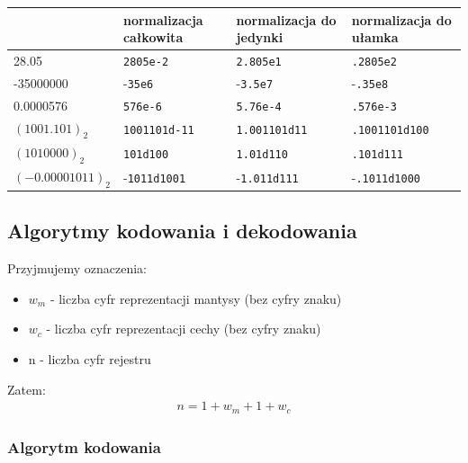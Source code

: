 \documentclass[12pt]{article}
\begin{document}
        \begin{table}
        \centering
        \begin{tabular}{l|l|l|l}
                          & normalizacja
        całkowita & normalizacja
        do jedynki & normalizacja
        do ułamka  \\ 
        \hline
        28.05             & \texttt{2805e-2}                & \texttt{2.805e1}                  & \texttt{.2805e2}                  \\
        -35000000         & -\texttt{35e6}                & -\texttt{3.5e7}                   & -\texttt{.35e8}                   \\
        0.0000576         & \texttt{576e-6}                  & \texttt{5.76e-4}                  & \texttt{.576e-3}                  \\ 
        \hline
        $(1001.101)_2$    & \texttt{1001101d-11}             & \texttt{1.001101d11}              & \texttt{.1001101d100}             \\
        $(1010000)_2$     & \texttt{101d100}                 & \texttt{1.01d110}                 & \texttt{.101d111}                 \\
        $(-0.00001011)_2$ & -\texttt{1011d1001}              & -\texttt{1.011d111}               & -\texttt{.1011d1000}             
        \end{tabular}
        \end{table}
        
    \subsection{Algorytmy kodowania i dekodowania}
    Przyjmujemy oznaczenia:
    \begin{itemize}
        \item $w_m$ - liczba cyfr reprezentacji mantysy (bez cyfry znaku)
        \item $w_c$ - liczba cyfr reprezentacji cechy (bez cyfry znaku)
        \item n - liczba cyfr rejestru
    \end{itemize}
    Zatem:
    \begin{align*}
        n = 1 + w_m + 1 + w_c
    \end{align*}
    
    \subsubsection{Algorytm kodowania}
    
\end{document}
